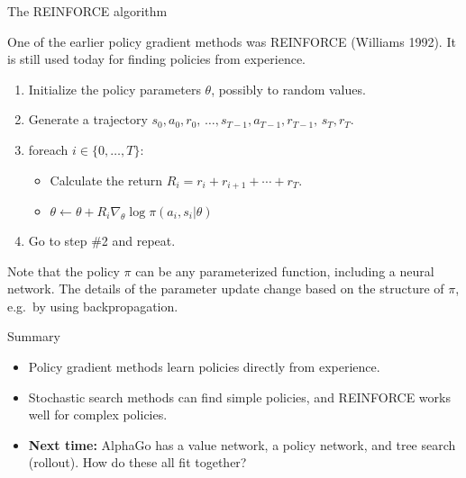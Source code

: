 \documentclass[9pt]{beamer}
\begin{document}
\begin{frame}{The REINFORCE algorithm}

One of the earlier policy gradient methods was REINFORCE (Williams 1992). It is still used today for finding policies from experience.

\pause\bigskip
\begin{enumerate}\addtolength{\itemsep}{0.5\baselineskip}
	\item Initialize the policy parameters $\theta$, possibly to random values.
	\item Generate a trajectory $s_0,a_0,r_0,\,\ldots,s_{T-1},a_{T-1},r_{T-1},\,s_T,r_T$.
	\item foreach $i\in \{0,\ldots,T\}$:
		\begin{itemize}\addtolength{\itemsep}{0.5\baselineskip}
			\item Calculate the return $R_i = r_i + r_{i+1} + \cdots + r_T$.
			\item $\theta \leftarrow \theta + R_i\nabla_\theta \log \pi(a_i,s_i|\theta)$
		\end{itemize}
	\item Go to step \#2 and repeat.
\end{enumerate}
	
\pause
\bigskip
Note that the policy $\pi$ can be any parameterized function, including a neural network. The details of the parameter update change based on the structure of $\pi$, e.g.\ by using backpropagation.

\end{frame}

\begin{frame}{Summary}

\begin{itemize}\addtolength{\itemsep}{0.5\baselineskip}
	\item Policy gradient methods learn policies directly from experience.
	\item Stochastic search methods can find simple policies, and REINFORCE works well for complex policies.
	\item<2-> \textbf{Next time:} AlphaGo has a value network, a policy network, and tree search (rollout). How do these all fit together?
\end{itemize}
	
\end{frame}
\end{document}
